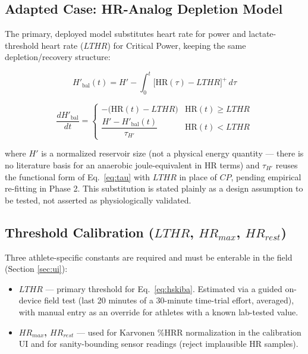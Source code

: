 \documentclass[11pt, letterpaper]{article}
\begin{document}
\subsection{Adapted Case: HR-Analog Depletion Model}
\label{sec:hprime}

The primary, deployed model substitutes heart rate for power and lactate-threshold heart rate
($LTHR$) for Critical Power, keeping the same depletion/recovery structure:

\begin{equation}
  H'_{\mathrm{bal}}(t) = H' - \int_{0}^{t} \bigl[\mathrm{HR}(\tau) - LTHR\bigr]^{+} \, d\tau
  \label{eq:hdepletion}
\end{equation}

\begin{equation}
  \frac{dH'_{\mathrm{bal}}}{dt} =
  \begin{cases}
    -\!\bigl(\mathrm{HR}(t) - LTHR\bigr) & \mathrm{HR}(t) \geq LTHR \\[6pt]
    \dfrac{H' - H'_{\mathrm{bal}}(t)}{\tau_{H'}} & \mathrm{HR}(t) < LTHR
  \end{cases}
  \label{eq:hskiba}
\end{equation}

where $H'$ is a normalized reservoir size (not a physical energy quantity --- there is no
literature basis for an anaerobic joule-equivalent in HR terms) and $\tau_{H'}$ reuses the
functional form of Eq.~\eqref{eq:tau} with $LTHR$ in place of $CP$, pending empirical
re-fitting in Phase 2. This substitution is stated plainly as a design assumption to be tested,
not asserted as physiologically validated.

\subsection{Threshold Calibration ($LTHR$, $HR_{max}$, $HR_{rest}$)}

Three athlete-specific constants are required and must be enterable in the field (Section
\ref{sec:ui}):
\begin{itemize}
  \item \textbf{$LTHR$} --- primary threshold for Eq.~\eqref{eq:hskiba}. Estimated via a guided
    on-device field test (last 20 minutes of a 30-minute time-trial effort, averaged), with
    manual entry as an override for athletes with a known lab-tested value.
  \item \textbf{$HR_{max}$, $HR_{rest}$} --- used for Karvonen \%HRR normalization in the
    calibration UI and for sanity-bounding sensor readings (reject implausible HR samples).
\end{itemize}
\end{document}
